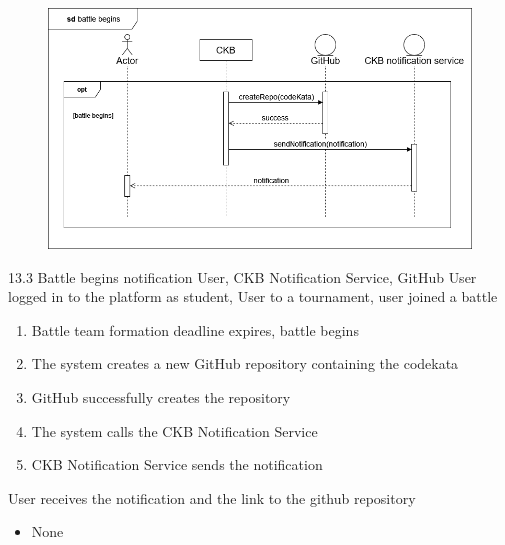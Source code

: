 \usecase
{
    \begin{figure}[H]
        \centering
        \includegraphics[width=\textwidth]{src/sequence_diagrams/battlebegins.png}
    \end{figure}
}
{13.3}
{Battle begins notification} %
{User, CKB Notification Service, GitHub} %
{User logged in to the platform as student, User to a tournament, user joined a battle} %
{ %
    \begin{enumerate}
        \item Battle team formation deadline expires, battle begins
        \item The system creates a new GitHub repository containing the codekata
        \item GitHub successfully creates the repository 
        \item The system calls the CKB Notification Service 
        \item CKB Notification Service sends the notification
    \end{enumerate}
}
{User receives the notification and the link to the github repository} %
{ %
    \begin{itemize}
        \item None
    \end{itemize}
}
{ %

}

